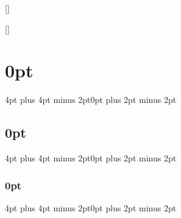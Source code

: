 \titleformat{\part}{\huge\sffamily\bfseries}{\thepart}{0.5em}{}
\titleformat{\chapter}{\LARGE\sffamily\bfseries}{\thechapter}{0.5em}{}
\titleformat{\section}{\Large\sffamily\bfseries}{\thesection}{0.5em}{}
\titleformat{\subsection}{\large\sffamily\bfseries}{\thesubsection}{0.5em}{}
\titleformat{\subsubsection}{\large\sffamily\mdseries}{\thesubsubsection}{0.5em}{}
\titleformat{\paragraph}[runin]{\normalsize\sffamily\mdseries}{\theparagraph}{0.5em}{}[\hspace{1em}]
\titleformat{\subparagraph}[runin]{\normalsize\sffamily\mdseries}{\thesubparagraph}{0.5em}{}[\hspace{1em}]

\titlespacing\section{0pt}{4pt plus 4pt minus 2pt}{0pt plus 2pt minus 2pt}
\titlespacing\subsection{0pt}{4pt plus 4pt minus 2pt}{0pt plus 2pt minus 2pt}
\titlespacing\subsubsection{0pt}{4pt plus 4pt minus 2pt}{0pt plus 2pt minus 2pt}

